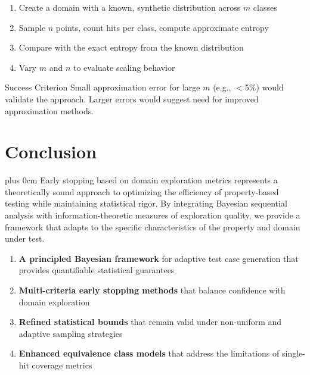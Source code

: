 \documentclass[conference]{IEEEtran}
\newcommand{\justifytext}{\leftskip=0pt \rightskip=0pt plus 0cm}
\begin{document}
\begin{tcolorbox}[
  colback=blue!5!white,
  colframe=blue!75!black,
  title=Experimental Design,
  fonttitle=\bfseries
]
\begin{enumerate}
\item Create a domain with a known, synthetic distribution across $m$ classes
\item Sample $n$ points, count hits per class, compute approximate entropy
\item Compare with the exact entropy from the known distribution
\item Vary $m$ and $n$ to evaluate scaling behavior
\end{enumerate}
\end{tcolorbox}

\begin{definitionbox}{Success Criterion}
Small approximation error for large $m$ (e.g., $<$5\%) would validate the approach. Larger errors would suggest need for improved approximation methods.
\end{definitionbox}

\section{Conclusion}

\justifytext
Early stopping based on domain exploration metrics represents a theoretically sound approach to optimizing the efficiency of property-based testing while maintaining statistical rigor. By integrating Bayesian sequential analysis with information-theoretic measures of exploration quality, we provide a framework that adapts to the specific characteristics of the property and domain under test.

\begin{tcolorbox}[
  colback=green!5!white,
  colframe=green!75!black,
  title=Key Contributions,
  fonttitle=\bfseries
]
\begin{enumerate}
\item \textbf{A principled Bayesian framework} for adaptive test case generation that provides quantifiable statistical guarantees
\item \textbf{Multi-criteria early stopping methods} that balance confidence with domain exploration
\item \textbf{Refined statistical bounds} that remain valid under non-uniform and adaptive sampling strategies
\item \textbf{Enhanced equivalence class models} that address the limitations of single-hit coverage metrics
\end{enumerate}
\end{tcolorbox}
\end{document}
